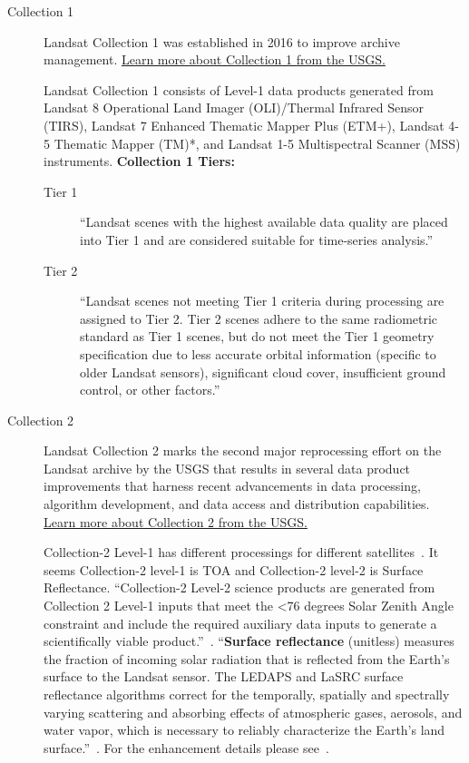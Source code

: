 \begin{description}
\item [Collection 1] Landsat Collection 1 was 
established in 2016 to improve archive management.
\href{https://www.usgs.gov/core-science-systems/nli/landsat/landsat-collection-1?qt-science_support_page_related_con=1#qt-science_support_page_related_con}{Learn more about Collection 1 from the USGS.}

Landsat Collection 1 consists of Level-1 data products 
generated from Landsat 8 Operational Land Imager (OLI)/Thermal 
Infrared Sensor (TIRS), Landsat 7 Enhanced Thematic Mapper 
Plus (ETM+), Landsat 4-5 Thematic Mapper (TM)*, and Landsat 1-5 
Multispectral Scanner (MSS) instruments.
\textbf{Collection 1 Tiers:}
    \begin{description}
    \item [Tier 1]
    ``Landsat scenes with the highest available data quality are placed into 
    Tier 1 and are considered suitable for time-series analysis.''~\citep{C1Describe}
    
    \item [Tier 2] ``Landsat scenes not meeting Tier 1 criteria during processing
     are assigned to Tier 2. Tier 2 scenes adhere to the same radiometric 
     standard as Tier 1 scenes, but do not meet the Tier 1 geometry 
     specification due to less accurate orbital information 
     (specific to older Landsat sensors), significant cloud cover, 
     insufficient ground control, or other factors.''~\citep{C1Describe}
    \end{description}
\item [Collection 2] 
Landsat Collection 2 marks the second major reprocessing effort on 
the Landsat archive by the USGS that results in several data product 
improvements that harness recent advancements in data processing, 
algorithm development, and data access and distribution capabilities. 
\href{https://www.usgs.gov/core-science-systems/nli/landsat/landsat-collection-2?qt-science_support_page_related_con=1#}{Learn more about Collection 2 from the USGS.}

Collection-2 Level-1 has different processings for different satellites~\citep{C2L1Describe}.
It seems Collection-2 level-1 is TOA and Collection-2 level-2 is Surface Reflectance. 
``Collection-2 Level-2 science products are generated from Collection 2 Level-1 
inputs that meet the <76 degrees Solar Zenith Angle constraint and include the 
required auxiliary data inputs to generate a scientifically viable 
product.''~\citep{C2L2Describe}.
``\textbf{Surface reflectance} (unitless) 
measures the fraction of incoming solar radiation that is 
reflected from the Earth's surface to the Landsat sensor. 
The LEDAPS and LaSRC surface reflectance algorithms 
correct for the temporally, spatially and spectrally varying scattering 
and absorbing effects of atmospheric gases, aerosols, and water vapor, 
which is necessary to reliably characterize the Earth’s land surface.''~\citep{C2L2Describe}.
For the enhancement details please see~\citep{C2L2Describe}.
\end{description}


